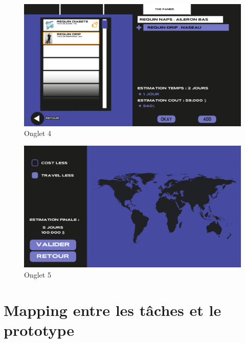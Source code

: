 \documentclass{article}
\begin{document}
\vspace{1cm}

\begin{figure}[!h]
	\centering
	\includegraphics[width=14.4cm]{assets/prototype/basse/onglet4}
	\caption{\label{assets/prototype/basse/onglet4} Onglet 4}
\end{figure}

\begin{figure}[!h]
	\centering
	\includegraphics[width=14.4cm]{assets/prototype/basse/onglet5}
	\caption{\label{assets/prototype/basse/onglet5} Onglet 5}
\end{figure}

\clearpage
\section{Mapping entre les tâches et le prototype}
\end{document}
